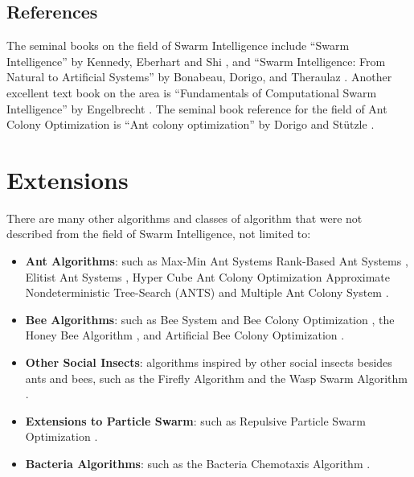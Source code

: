 \begin{bibunit}
\subsection{References}
The seminal books on the field of Swarm Intelligence include ``Swarm Intelligence'' by Kennedy, Eberhart and Shi \cite{Kennedy2001}, and ``Swarm Intelligence: From Natural to Artificial Systems'' by Bonabeau, Dorigo, and Theraulaz \cite{Bonabeau1999}. Another excellent text book on the area is ``Fundamentals of Computational Swarm Intelligence'' by Engelbrecht \cite{Engelbrecht2006}. The seminal book reference for the field of Ant Colony Optimization is ``Ant colony optimization'' by Dorigo and St\"utzle \cite{Dorigo2004}.

% 
% 
\section{Extensions}
There are many other algorithms and classes of algorithm that were not described from the field of Swarm Intelligence, not limited to:

\begin{itemize}
	\item \textbf{Ant Algorithms}: such as Max-Min Ant Systems \cite{Stutzle2000} Rank-Based Ant Systems \cite{Bullnheimer1999}, Elitist Ant Systems \cite{Dorigo1996}, Hyper Cube Ant Colony Optimization \cite{Blum2001} Approximate Nondeterministic Tree-Search (ANTS) \cite{Maniezzo1999} and Multiple Ant Colony System \cite{Gambardella1999}.
	\item \textbf{Bee Algorithms}: such as Bee System and Bee Colony Optimization \cite{Lucic2001}, the Honey Bee Algorithm \cite{Tovey2004}, and Artificial Bee Colony Optimization \cite{Karaboga2005, Basturk2006}.
	\item \textbf{Other Social Insects}: algorithms inspired by other social insects besides ants and bees, such as the Fireﬂy Algorithm \cite{Yang2008} and the Wasp Swarm Algorithm \cite{Pinto2007}.
	\item \textbf{Extensions to Particle Swarm}: such as Repulsive Particle Swarm Optimization \cite{Urfalioglu2004}.
	\item \textbf{Bacteria Algorithms}: such as the Bacteria Chemotaxis Algorithm \cite{Muller2002}.
\end{itemize}

\putbib
\end{bibunit}


\newpage\begin{bibunit}\putbib\end{bibunit}
\newpage\begin{bibunit}\putbib\end{bibunit}
\newpage\begin{bibunit}\putbib\end{bibunit}
\newpage\begin{bibunit}\putbib\end{bibunit}
\newpage\begin{bibunit}\putbib\end{bibunit}
